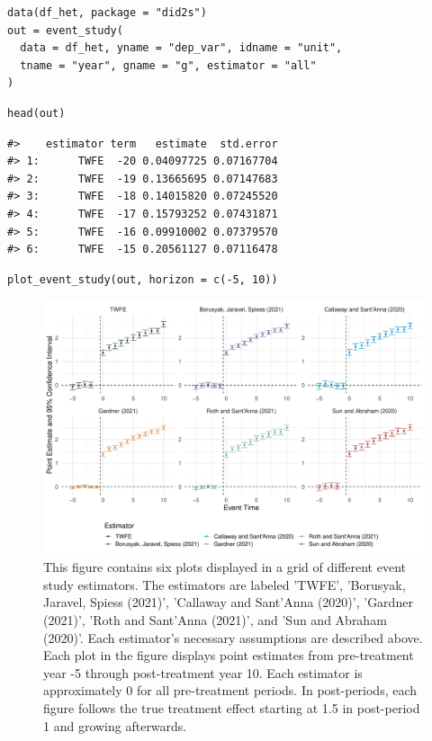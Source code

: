 \begin{verbatim}
data(df_het, package = "did2s")
out = event_study(
  data = df_het, yname = "dep_var", idname = "unit",
  tname = "year", gname = "g", estimator = "all"
)
\end{verbatim}

\begin{verbatim}
head(out)
\end{verbatim}

\begin{verbatim}
#>    estimator term   estimate  std.error
#> 1:      TWFE  -20 0.04097725 0.07167704
#> 2:      TWFE  -19 0.13665695 0.07147683
#> 3:      TWFE  -18 0.14015820 0.07245520
#> 4:      TWFE  -17 0.15793252 0.07431871
#> 5:      TWFE  -16 0.09910002 0.07379570
#> 6:      TWFE  -15 0.20561127 0.07116478
\end{verbatim}

\begin{verbatim}
plot_event_study(out, horizon = c(-5, 10))
\end{verbatim}

\begin{figure}
\includegraphics[width=1\linewidth]{RJ-2022-048_files/figure-latex/es-alternatives-1} \caption{This figure contains six plots displayed in a grid of different event study estimators. The estimators are labeled 'TWFE', 'Borusyak, Jaravel, Spiess (2021)', 'Callaway and Sant'Anna (2020)', 'Gardner (2021)', 'Roth and Sant'Anna (2021)', and 'Sun and Abraham (2020)'. Each estimator's necessary assumptions are described above. Each plot in the figure displays point estimates from pre-treatment year -5 through post-treatment year 10. Each estimator is approximately 0 for all pre-treatment periods. In post-periods, each figure follows the true treatment effect starting at 1.5 in post-period 1 and growing afterwards.}\label{fig:es-alternatives}
\end{figure}

